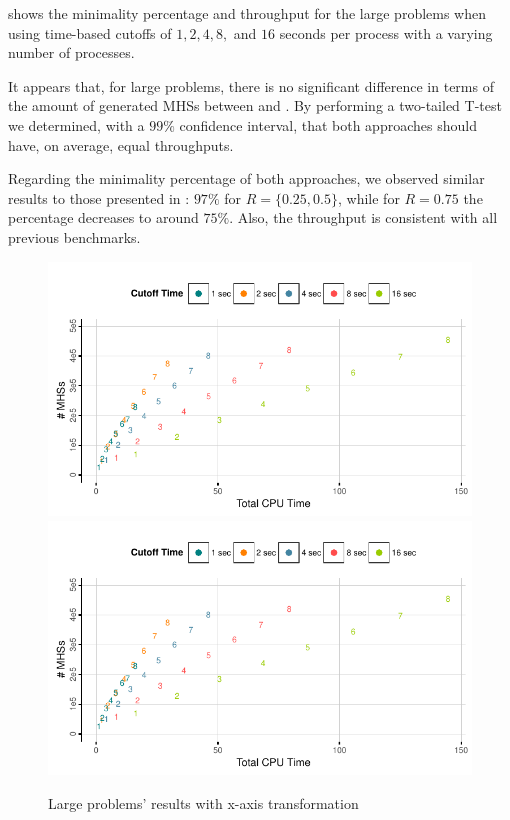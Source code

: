  shows the minimality percentage and
throughput for the large problems when using time-based cutoffs of $1,
2, 4, 8,$ and $16$ seconds per process with a varying number of
processes.

It appears that, for large problems, there is no significant
difference in terms of the amount of generated \acp{MHS} between
\randomFn{} and \strideFn{}.
%
By performing a two-tailed T-test we determined, with a $99\%$
confidence interval, that both approaches should have, on average,
equal throughputs.
%

Regarding the minimality percentage of both approaches, we observed
similar results to those presented in
: $97\%$ for $R =
\{0.25,0.5\}$, while for $R=0.75$ the percentage decreases to around
$75\%$.
%
Also, the throughput is consistent with all previous benchmarks.

\begin{figure}[ht]
  \includegraphics[trim=0.5em 2.65em 0em 0em, clip, page=1]{figures/mhs2/figures/parallel_scatter_large.pdf}
  \includegraphics[trim=0.5em 0em 0em 3.3em, clip, page=3]{figures/mhs2/figures/parallel_scatter_large.pdf}
  \caption{Large problems' results with x-axis
    transformation\label{fig:mhs2p:results:large-scatter-linear}}
\end{figure}

